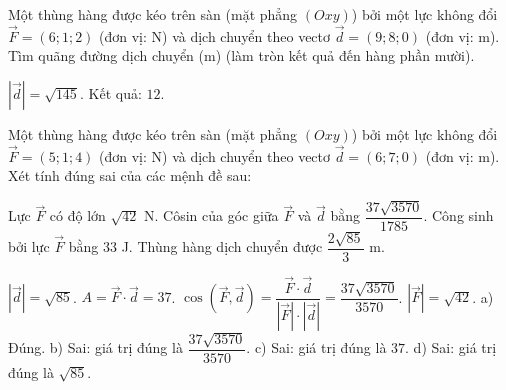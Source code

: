 \begin{vidu}
Một thùng hàng được kéo trên sàn (mặt phẳng $(Oxy)$) bởi một lực không đổi $\vec F=(6;1;2)$ (đơn vị: N) và dịch chuyển theo vectơ $\vec d=(9;8;0)$ (đơn vị: m). Tìm quãng đường dịch chuyển (m) (làm tròn kết quả đến hàng phần mười).

\begin{loigiai}
\giai $|\vec d|=\sqrt{145}$. Kết quả: $12$.
\end{loigiai}
\end{vidu}
\begin{viduds}
Một thùng hàng được kéo trên sàn (mặt phẳng $(Oxy)$) bởi một lực không đổi $\vec F=(5;1;4)$ (đơn vị: N) và dịch chuyển theo vectơ $\vec d=(6;7;0)$ (đơn vị: m). Xét tính đúng sai của các mệnh đề sau:

\begin{dungsai}
  \y Lực $\vec F$ có độ lớn $\sqrt{42}$ N. \oDS
  \y Côsin của góc giữa $\vec F$ và $\vec d$ bằng $\dfrac{37 \sqrt{3570}}{1785}$. \oDS
  \y Công sinh bởi lực $\vec F$ bằng $33$ J. \oDS
  \y Thùng hàng dịch chuyển được $\dfrac{2 \sqrt{85}}{3}$ m. \oDS
\end{dungsai}
\begin{loigiai}
\giai $|\vec d|=\sqrt{85}$. $A=\vec F\cdot\vec d=37$. $\cos(\vec F,\vec d)=\dfrac{\vec F\cdot\vec d}{|\vec F|\cdot|\vec d|}=\dfrac{37 \sqrt{3570}}{3570}$. $|\vec F|=\sqrt{42}$. a) Đúng. b) Sai: giá trị đúng là $\dfrac{37 \sqrt{3570}}{3570}$. c) Sai: giá trị đúng là $37$. d) Sai: giá trị đúng là $\sqrt{85}$.
\end{loigiai}
\end{viduds}

